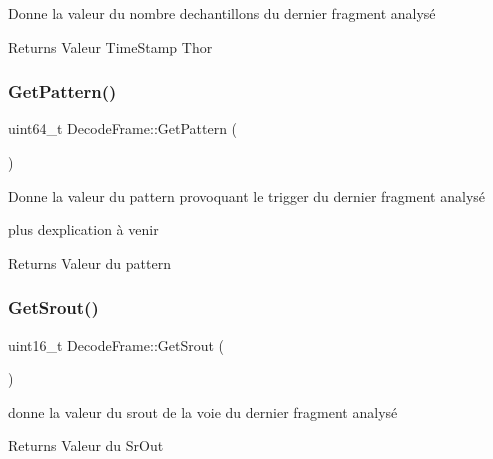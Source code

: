 Donne la valeur du nombre d\textquotesingle{}echantillons du dernier fragment analysé 

\begin{DoxyReturn}{Returns}
Valeur Time\+Stamp Thor 
\end{DoxyReturn}
\mbox{\label{classDecodeFrame_a036d1c2974dc06c43ee945b7586a14d6}} 
\subsubsection{\texorpdfstring{Get\+Pattern()}{GetPattern()}}
{\footnotesize\ttfamily uint64\+\_\+t Decode\+Frame\+::\+Get\+Pattern (\begin{DoxyParamCaption}{ }\end{DoxyParamCaption})\hspace{0.3cm}{\ttfamily [inline]}}



Donne la valeur du pattern provoquant le trigger du dernier fragment analysé 

plus d\textquotesingle{}explication à venir \begin{DoxyReturn}{Returns}
Valeur du pattern 
\end{DoxyReturn}
\mbox{\label{classDecodeFrame_a7418f106eb0998d886ce5849cfb031d9}} 
\subsubsection{\texorpdfstring{Get\+Srout()}{GetSrout()}}
{\footnotesize\ttfamily uint16\+\_\+t Decode\+Frame\+::\+Get\+Srout (\begin{DoxyParamCaption}{ }\end{DoxyParamCaption})\hspace{0.3cm}{\ttfamily [inline]}}



donne la valeur du srout de la voie du dernier fragment analysé 

\begin{DoxyReturn}{Returns}
Valeur du Sr\+Out 
\end{DoxyReturn}
\mbox{\label{classDecodeFrame_a5fafd547d67ae2f38635174a402b5824}} 
